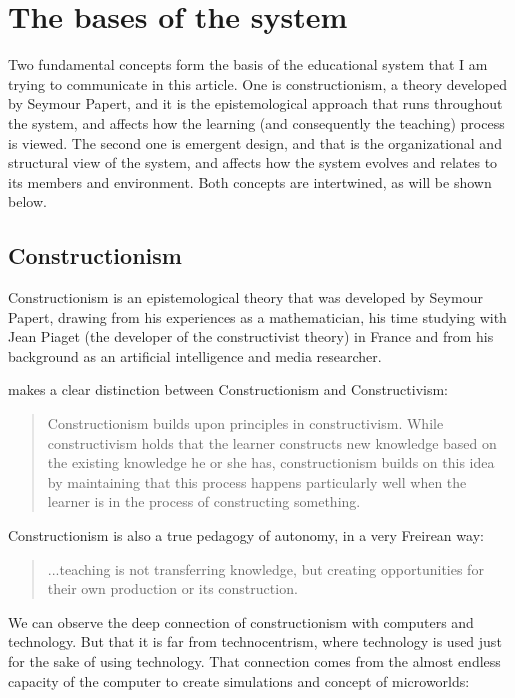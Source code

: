 \section{The bases of the system}
Two fundamental concepts form the basis of the educational system that I am
trying to communicate in this article. One is constructionism, a theory
developed by Seymour Papert, and it is the epistemological approach that runs
throughout the system, and affects how the learning (and consequently the
teaching) process is viewed.  The second one is emergent design, and that is the
organizational and structural view of the system, and affects how the system
evolves and relates to its members and environment. Both concepts are
intertwined, as will be shown below. 

\subsection{Constructionism}
Constructionism is an epistemological theory that was developed by Seymour
Papert, drawing from his experiences as a mathematician, his time studying with
Jean Piaget (the developer of the constructivist theory) in France and from his
background as an artificial intelligence and media researcher.

\cite{education:cavallo_building_knowledge} makes a clear distinction between Constructionism and
Constructivism:

\begin{quote}
    Constructionism builds upon principles in constructivism. While constructivism
    holds that the learner constructs new knowledge based on the existing knowledge
    he or she has, constructionism builds on this idea by maintaining that this
    process happens particularly well when the learner is in the process of
    constructing something.                   
\end{quote}

Constructionism is also a true pedagogy of autonomy, in a very Freirean way:
\begin{quote}
    ...teaching is not transferring knowledge, but creating opportunities for their own
    production or its construction.
    \cite{education:paulo_freire__pedagogia_da_autonomia}
\end{quote}

We can observe the deep connection of constructionism with computers and
technology. But that it is far from technocentrism, where technology is used just
for the sake of using technology. That connection comes from the almost endless
capacity of the computer to create simulations and concept of microworlds:

